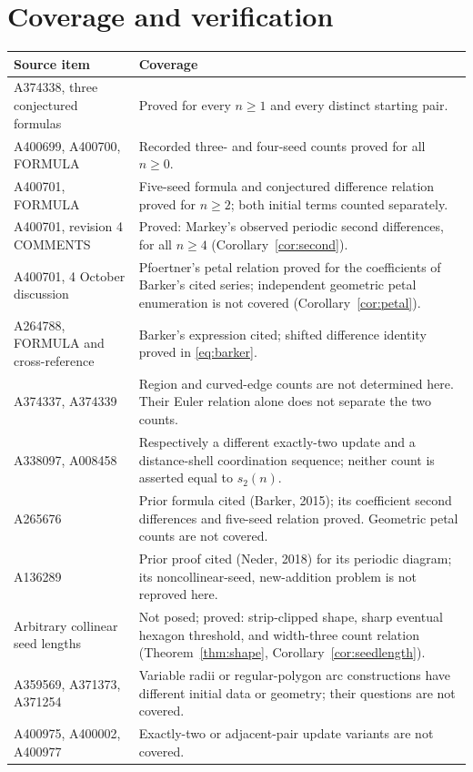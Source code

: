 \documentclass[11pt]{article}
\begin{document}
\section{Coverage and verification}
\begin{center}\small
\begin{tabularx}{\textwidth}{@{}lX@{}}
\toprule
Source item & Coverage\\\midrule
A374338, three conjectured formulas & Proved for every $n\geq1$ and every distinct starting pair.\\
A400699, A400700, FORMULA & Recorded three- and four-seed counts proved for all $n\geq0$.\\
A400701, FORMULA & Five-seed formula and conjectured difference relation proved for $n\geq2$; both initial terms counted separately.\\
A400701, revision 4 COMMENTS & Proved: Markey's observed periodic second differences, for all $n\geq4$ (Corollary~\ref{cor:second}).\\
A400701, 4 October discussion & Pfoertner's petal relation proved for the coefficients of Barker's cited series; independent geometric petal enumeration is not covered (Corollary~\ref{cor:petal}).\\
A264788, FORMULA and cross-reference & Barker's expression cited; shifted difference identity proved in \eqref{eq:barker}.\\
A374337, A374339 \cite{regions} & Region and curved-edge counts are not determined here. Their Euler relation alone does not separate the two counts.\\
A338097, A008458 \cite{sigrist,shells} & Respectively a different exactly-two update and a distance-shell coordination sequence; neither count is asserted equal to $s_2(n)$.\\
A265676 \cite{petals} & Prior formula cited (Barker, 2015); its coefficient second differences and five-seed relation proved. Geometric petal counts are not covered.\\
A136289 \cite{neder} & Prior proof cited (Neder, 2018) for its periodic diagram; its noncollinear-seed, new-addition problem is not reproved here.\\
Arbitrary collinear seed lengths & Not posed; proved: strip-clipped shape, sharp eventual hexagon threshold, and width-three count relation (Theorem~\ref{thm:shape}, Corollary~\ref{cor:seedlength}).\\
A359569, A371373, A371254 \cite{othercircles} & Variable radii or regular-polygon arc constructions have different initial data or geometry; their questions are not covered.\\
A400975, A400002, A400977 \cite{otherrules} & Exactly-two or adjacent-pair update variants are not covered.\\
\bottomrule
\end{tabularx}
\end{center}
\end{document}
